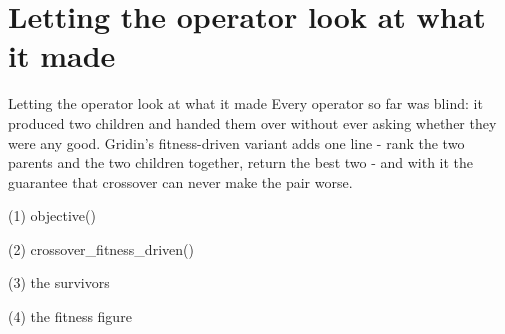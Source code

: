 
\section{Letting the operator look at what it made}

\begin{frame}{Letting the operator look at what it made}
Every operator so far was blind: it produced two children and handed them over
without ever asking whether they were any good. Gridin's fitness-driven variant
adds one line - rank the two parents and the two children together, return the
best two - and with it the guarantee that crossover can never make the pair
worse.
\end{frame}

\begin{frame}[fragile]{(1) objective()}

\end{frame}

\begin{frame}[fragile]{(2) crossover\_fitness\_driven()}

\end{frame}

\begin{frame}[fragile]{(3) the survivors}

\end{frame}

\begin{frame}[fragile]{(4) the fitness figure}

\end{frame}


